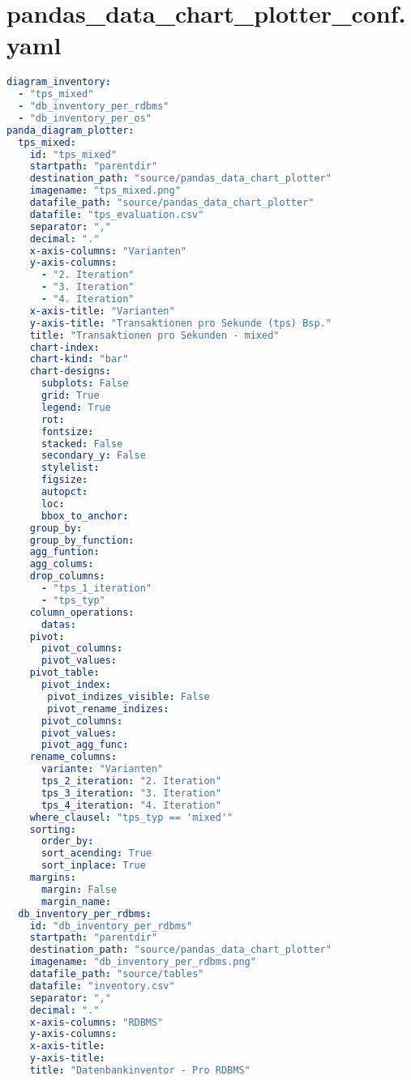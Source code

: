 
\section{pandas\_data\_chart\_plotter\_conf.yaml}
\lstset{style=gra_codestyle}
\begin{lstlisting}[language=yaml, caption=Python LaTex - pandas\_data\_chart\_plotter\_conf.yaml - Konfigurationsdatei - CSV - Diagramme,captionpos=b,label={lst:pandas_data_chart_plotter_conf},breaklines=true]
diagram_inventory:
  - "tps_mixed"
  - "db_inventory_per_rdbms"
  - "db_inventory_per_os"
panda_diagram_plotter:
  tps_mixed:
    id: "tps_mixed"
    startpath: "parentdir"
    destination_path: "source/pandas_data_chart_plotter"
    imagename: "tps_mixed.png"
    datafile_path: "source/pandas_data_chart_plotter"
    datafile: "tps_evaluation.csv"
    separator: ","
    decimal: "."
    x-axis-columns: "Varianten"
    y-axis-columns:
      - "2. Iteration"
      - "3. Iteration"
      - "4. Iteration"
    x-axis-title: "Varianten"
    y-axis-title: "Transaktionen pro Sekunde (tps) Bsp."
    title: "Transaktionen pro Sekunden - mixed"
    chart-index:
    chart-kind: "bar"
    chart-designs:
      subplots: False
      grid: True
      legend: True
      rot:
      fontsize:
      stacked: False
      secondary_y: False
      stylelist:
      figsize:
      autopct:
      loc:
      bbox_to_anchor:
    group_by:
    group_by_function:
    agg_funtion:
    agg_colums:
    drop_columns:
      - "tps_1_iteration"
      - "tps_typ"
    column_operations:
      datas:
    pivot:
      pivot_columns:
      pivot_values:
    pivot_table:
      pivot_index:
       pivot_indizes_visible: False
       pivot_rename_indizes:
      pivot_columns:
      pivot_values:
      pivot_agg_func:
    rename_columns:
      variante: "Varianten"
      tps_2_iteration: "2. Iteration"
      tps_3_iteration: "3. Iteration"
      tps_4_iteration: "4. Iteration"
    where_clausel: "tps_typ == 'mixed'"
    sorting:
      order_by:
      sort_acending: True
      sort_inplace: True
    margins:
      margin: False
      margin_name:
  db_inventory_per_rdbms:
    id: "db_inventory_per_rdbms"
    startpath: "parentdir"
    destination_path: "source/pandas_data_chart_plotter"
    imagename: "db_inventory_per_rdbms.png"
    datafile_path: "source/tables"
    datafile: "inventory.csv"
    separator: ","
    decimal: "."
    x-axis-columns: "RDBMS"
    y-axis-columns:
    x-axis-title:
    y-axis-title:
    title: "Datenbankinventor - Pro RDBMS"

\end{lstlisting}
